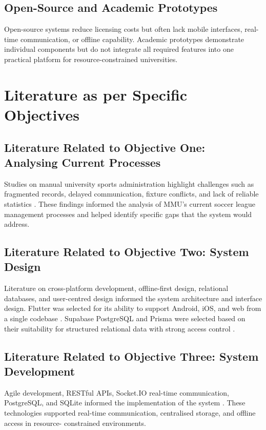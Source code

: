 \documentclass[12pt,a4paper]{report}
\begin{document}
\subsection{Open-Source and Academic Prototypes}
Open-source systems reduce licensing costs but often lack mobile interfaces, real-time
communication, or offline capability. Academic prototypes demonstrate individual components
but do not integrate all required features into one practical platform for resource-constrained
universities.


\section{Literature as per Specific Objectives}

\subsection{Literature Related to Objective One: Analysing Current Processes}
Studies on manual university sports administration highlight challenges such as fragmented
records, delayed communication, fixture conflicts, and lack of reliable statistics
\cite{sarlak2024,pmc2023}. These findings informed the analysis of MMU's current soccer
league management processes and helped identify specific gaps that the system would address.

\subsection{Literature Related to Objective Two: System Design}
Literature on cross-platform development, offline-first design, relational databases, and
user-centred design informed the system architecture and interface design. Flutter was
selected for its ability to support Android, iOS, and web from a single codebase
\cite{vec2024,flutter2024}. Supabase PostgreSQL and Prisma were selected based on their
suitability for structured relational data with strong access control \cite{postgresql2024,supabase2024}.

\subsection{Literature Related to Objective Three: System Development}
Agile development, RESTful APIs, Socket.IO real-time communication, PostgreSQL, and SQLite
informed the implementation of the system \cite{xu2024,socketio2024}. These technologies
supported real-time communication, centralised storage, and offline access in resource-
constrained environments.
\end{document}
